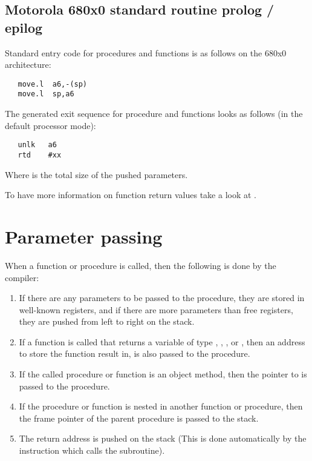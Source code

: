 \subsection{Motorola 680x0 standard routine prolog / epilog}

Standard entry code for procedures and functions is as follows on the
680x0 architecture:
\begin{verbatim}
   move.l  a6,-(sp)
   move.l  sp,a6
\end{verbatim}

The generated exit sequence for procedure and functions looks as follows
(in the default processor mode):
\begin{verbatim}
   unlk   a6
   rtd    #xx
\end{verbatim}

Where  is the total size of the pushed parameters.

To have more information on function return values take a look at
.

\section{Parameter passing}
\label{se:Parameters}

When a function or procedure is called, then the following is done by the
compiler:
\begin{enumerate}
\item If there are any parameters to be passed to the procedure, they are
stored in well-known registers, and if there are more parameters than free
registers, they are pushed from left to right on the stack.
\item If a function is called that returns a variable of type ,
, ,  or , then an address to
store the function result in, is also passed to the procedure.
\item If the called procedure or function is an object method, then the
pointer to  is passed to the procedure.
\item If the procedure or function is nested in another function or
procedure, then the frame pointer of the parent procedure is passed 
to the stack.
\item The return address is pushed on the stack (This is done automatically
by the instruction which calls the subroutine).
\end{enumerate}

